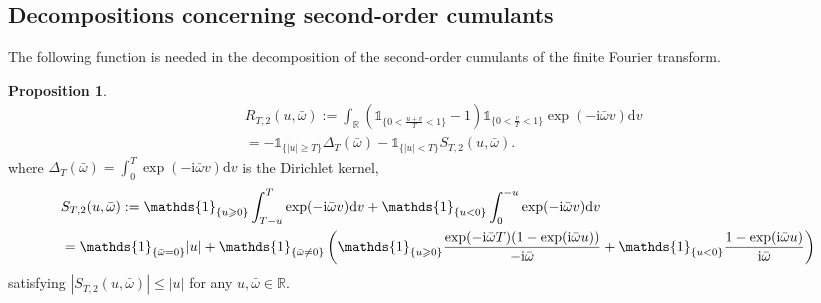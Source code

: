 \documentclass[11pt]{article}
\numberwithin{equation}{section}
\theoremstyle{plain}
\theoremstyle{definition}
\theoremstyle{definition}
\theoremstyle{assumption}
\theoremstyle{proposition}
\newtheorem{proposition}{Proposition}[section]
\theoremstyle{proposition}
\theoremstyle{example}
\theoremstyle{lemma}
\theoremstyle{theorem}
\theoremstyle{remark}
\begin{document}
\subsection{Decompositions concerning second-order cumulants}
The following function is needed in the decomposition of the second-order cumulants of the finite Fourier transform.
\begin{proposition}\label{prop_R2}
\begin{align*}
&R_{T,2}(u,\bar{\omega}):=\int_{\mathbb{R}}( \mathds{1}_{\{0<\frac{u+v}{T}<1\}} - 1 )\mathds{1}_{\{0<\frac{v}{T}<1\}}\exp(-\mathrm{i}\bar{\omega}v)\mathrm{d}v \\
&= -\mathds{1}_{\{|u|\geqslant T\}} \Delta_T(\bar{\omega})
-\mathds{1}_{\{|u|< T\}}S_{T,2}(u,\bar{\omega}).
\end{align*}
where $\Delta_T(\bar{\omega}) = \int_{0}^T\exp(-\mathrm{i}\bar{
\omega} v) \mathrm{d}v$ is the Dirichlet kernel, 
\begin{align}\label{def_S2_eq}
& S_{T,2}(u,\bar{\omega}) := \mathds{1}_{\{u\geqslant0\}}\int_{T-u}^{T}\exp(-\mathrm{i}\bar{\omega}v)\mathrm{d}v + \mathds{1}_{\{u<0\}}\int_{0}^{-u}\exp(-\mathrm{i}\bar{\omega}v)\mathrm{d}v \\
&=\mathds{1}_{\{\bar{\omega} = 0\}}|u| + \mathds{1}_{\{\bar{\omega} \neq 0\}}\left(\mathds{1}_{\{u\geqslant0\}} \frac{\exp(-\mathrm{i}\bar{\omega}T)(1 - \exp(\mathrm{i}\bar{\omega}u))}{-\mathrm{i}\bar{\omega}} 
+ \mathds{1}_{\{u<0\}}\frac{ 1 - \exp(\mathrm{i}\bar{\omega}u) }{\mathrm{i}\bar{\omega}}\right) \notag
\end{align}
satisfying $|S_{T,2}(u,\bar{\omega})|\leqslant |u|$ for any $u,\bar{\omega}\in\mathbb{R}$.


\end{proposition}
\end{document}
